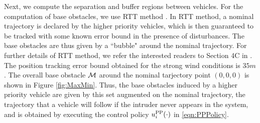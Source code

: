 Next, we compute the separation and buffer regions between vehicles. For the computation of base obstacles, we use RTT method \cite{Bansal2017}. In RTT method, a nominal trajectory is declared by the higher priority vehicles, which is then guaranteed to be tracked with some known error bound in the presence of disturbances. The base obstacles are thus given by a ``bubble" around the nominal trajectory. For further details of RTT method, we refer the interested readers to Section 4C in \cite{Bansal2017}. The position tracking error bound obtained for the strong wind conditions is $35m$ . The overall base obstacle $\mathcal{M}$ around the nominal tarjectory point $(0, 0, 0)$ is shown in Figure \ref{fig:MaxMin}. Thus, the base obstacles induced by a higher priority vehicle are given by this set augmented on the nominal trajectory, the trajectory that a vehicle will follow if the intruder never appears in the system, and is obtained by executing the control policy ${u^{\text{PP}}_{i}}(\cdot)$ in \eqref{eqn:PPPolicy}.

